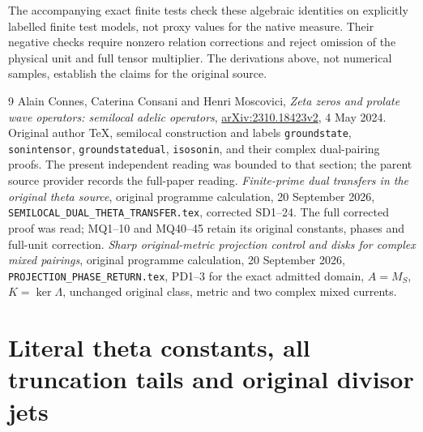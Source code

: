 \documentclass[11pt]{article}
\begin{document}
The accompanying exact finite tests check these algebraic identities
on explicitly labelled finite test models, not proxy values for the
native measure. Their negative checks require nonzero relation
corrections and reject omission of the physical unit and full
tensor multiplier. The derivations above, not numerical samples,
establish the claims for the original source.

\begin{thebibliography}{9}
 Alain Connes, Caterina Consani and Henri Moscovici,
\emph{Zeta zeros and prolate wave operators: semilocal adelic operators},
\href{https://arxiv.org/abs/2310.18423v2}{arXiv:2310.18423v2},
4 May 2024. Original author TeX, semilocal construction and labels
\texttt{groundstate}, \texttt{sonintensor}, \texttt{groundstatedual},
\texttt{isosonin}, and their complex dual-pairing proofs. The present
independent reading was bounded to that section; the parent source
provider records the full-paper reading.
 \emph{Finite-prime dual transfers in the original theta
source}, original programme calculation, 20 September 2026,
\texttt{SEMILOCAL\_DUAL\_THETA\_TRANSFER.tex}, corrected SD1--24.
The full corrected proof was read; MQ1--10 and MQ40--45 retain its
original constants, phases and full-unit correction.
 \emph{Sharp original-metric projection control and disks
for complex mixed pairings}, original programme calculation,
20 September 2026, \texttt{PROJECTION\_PHASE\_RETURN.tex},
PD1--3 for the exact admitted domain, $A=M_S$, $K=\ker\Lambda$,
unchanged original class, metric and two complex mixed currents.
\end{thebibliography}

\endgroup

\clearpage\begingroup
\part*{Literal theta constants, all truncation tails and original divisor jets}
\newtheorem{swthetatheorem}{Theorem}[section]
\newtheorem{swthetaproposition}[swthetatheorem]{Proposition}
\newcommand{\swthetaR}{\mathbb R}\newcommand{\swthetaC}{\mathbb C}
\newcommand{\swthetaM}{\mathcal M}\newcommand{\swthetaE}{\mathcal E}
\end{document}

